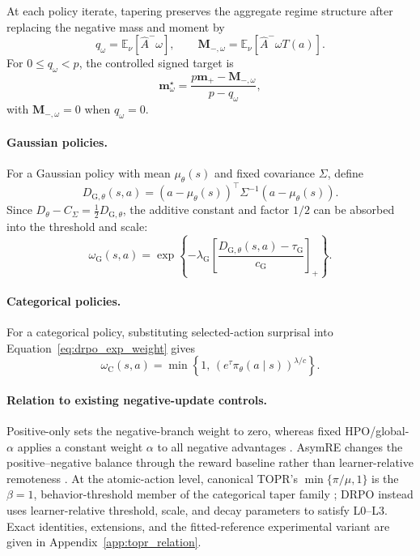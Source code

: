 \documentclass[sigconf,anonymous,review]{acmart}
\theoremstyle{acmdefinition}
\begin{document}
At each policy iterate, tapering preserves the aggregate regime structure
after replacing the negative mass and moment by
\[
q_\omega=\mathbb E_\nu[\widehat A^-\omega],
\qquad
\mathbf M_{-,\omega}=\mathbb E_\nu[\widehat A^-\omega T(a)].
\]
For \(0\le q_\omega<p\), the controlled signed target is
\[
\mathbf m_\omega^\star
=
\frac{p\mathbf m_+-\mathbf M_{-,\omega}}{p-q_\omega},
\]
with \(\mathbf M_{-,\omega}=0\) when \(q_\omega=0\).

\paragraph{Gaussian policies.}
For a Gaussian policy with mean \(\mu_\theta(s)\) and fixed covariance
\(\Sigma\), define
\begin{equation}
    D_{\mathrm G,\theta}(s,a)
    =
    (a-\mu_\theta(s))^\top
    \Sigma^{-1}
    (a-\mu_\theta(s)).
    \label{eq:gaussian_squared_distance}
\end{equation}
Since \(D_\theta-C_\Sigma=\frac12D_{\mathrm G,\theta}\), the additive
constant and factor \(1/2\) can be absorbed into the threshold and scale:
\begin{equation}
    \omega_{\mathrm G}(s,a)
    =
    \exp
    \left\{
        -\lambda_{\mathrm G}
        \left[
            \frac{D_{\mathrm G,\theta}(s,a)-\tau_{\mathrm G}}
                 {c_{\mathrm G}}
        \right]_{+}
    \right\}.
    \label{eq:drpo_gaussian_weight}
\end{equation}

\paragraph{Categorical policies.}
For a categorical policy, substituting selected-action surprisal into
Equation~\eqref{eq:drpo_exp_weight} gives
\begin{equation}
    \omega_{\mathrm C}(s,a)
    =
    \min
    \left\{
        1,\,
        \left(e^{\tau}\pi_\theta(a\mid s)\right)^{\lambda/c}
    \right\}.
    \label{eq:drpo_categorical_weight}
\end{equation}
\paragraph{Relation to existing negative-update controls.}
Positive-only sets the negative-branch weight to zero, whereas fixed
HPO/global-\(\alpha\) applies a constant weight \(\alpha\) to all
negative advantages \citep{sana2026hpo}. AsymRE changes the
positive--negative balance through the reward baseline rather than
learner-relative remoteness \citep{arnal2025asymmetric}. At the
atomic-action level, canonical TOPR's \(\min\{\pi/\mu,1\}\) is the
\(\beta=1\), behavior-threshold member of the categorical taper family
\citep{leroux2025tapered}; DRPO instead uses learner-relative threshold,
scale, and decay parameters to satisfy L0--L3. Exact identities,
extensions, and the fitted-reference experimental variant are given in
Appendix~\ref{app:topr_relation}.
\end{document}
